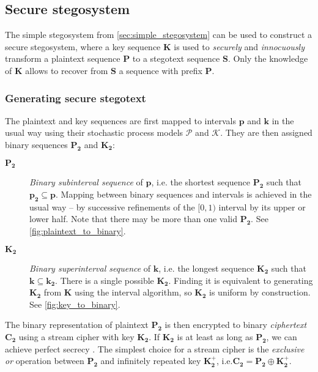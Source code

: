 \documentclass[draft]{IIBproject}
\makeatletter
\DeclareRobustCommand*{\ie}{i.e.\@\xspace}
\DeclareRobustCommand*{\AbbreviationWithDot}[1]{\@ifnextchar{.}{#1}{#1.\@\xspace}}
\DeclareRobustCommand*{\iid}{\AbbreviationWithDot{i.i.d}}
\makeatother
\begin{document}
\FloatBarrier
\subsection{Secure stegosystem}
\label{sec:secure_stegosystem}

The simple stegosystem from \cref{sec:simple_stegosystem} can be used to construct a secure stegosystem, where a key sequence $\mathbf K$ is used to \emph{securely} and \emph{innocuously} transform a plaintext sequence $\mathbf P$ to a stegotext sequence $\mathbf S$. Only the knowledge of $\mathbf K$ allows to recover from $\mathbf S$ a sequence with prefix $\mathbf P$.

\subsubsection{Generating secure stegotext}

The plaintext and key sequences are first mapped to intervals $\mathbf p$ and $\mathbf k$ in the usual way using their stochastic process models $\mathcal P$ and $\mathcal K$. They are then assigned binary sequences $\mathbf{P_2}$ and $\mathbf{K_2}$:

\begin{description}

\item[$\mathbf{P_2}$] \emph{Binary subinterval sequence} of $\mathbf p$, \ie the shortest sequence $\mathbf{P_2}$ such that $\mathbf {p_2} \subseteq \mathbf p$. Mapping between binary sequences and intervals is achieved in the usual way -- by successive refinements of the $[0,1)$ interval by its upper or lower half. Note that there may be more than one valid $\mathbf{P_2}$. See \cref{fig:plaintext_to_binary}.

\item[$\mathbf{K_2}$] \emph{Binary superinterval sequence} of $\mathbf k$, \ie the longest sequence $\mathbf{K_2}$ such that $\mathbf k \subseteq \mathbf {k_2}$. There is a single possible $\mathbf{K_2}$. Finding it is equivalent to generating $\mathbf{K_2}$ from $\mathbf K$ using the interval algorithm, so $\mathbf{K_2}$ is \iid uniform by construction. See \cref{fig:key_to_binary}.

\end{description}

The binary representation of plaintext $\mathbf{P_2}$ is then encrypted to binary \emph{ciphertext} $\mathbf{C_2}$ using a stream cipher with key $\mathbf{K_2}$. If $\mathbf{K_2}$ is at least as long as $\mathbf{P_2}$, we can achieve perfect secrecy \cite{shannon1949communication}. The simplest choice for a stream cipher is the \emph{exclusive or} operation between $\mathbf{P_2}$ and infinitely repeated key $\mathbf{K^+_2}$, \ie $\mathbf{C_2} = \mathbf{P_2} \oplus \mathbf{K^+_2}$.
\end{document}

